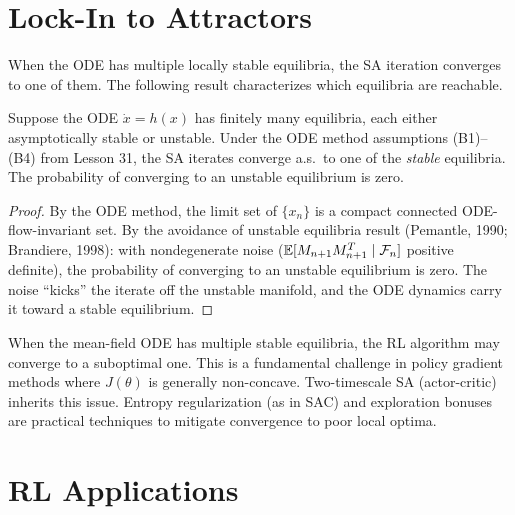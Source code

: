 \documentclass[11pt,a4paper]{article}
\begin{document}

\section{Lock-In to Attractors}
\label{sec:lock-in}

When the ODE has multiple locally stable equilibria, the SA iteration
converges to one of them. The following result characterizes which
equilibria are reachable.

\begin{proposition}
\label{prop:lock-in}
Suppose the ODE $\dot{x} = h(x)$ has finitely many equilibria, each
either asymptotically stable or unstable. Under the ODE method
assumptions (B1)--(B4) from Lesson 31, the SA iterates converge
a.s.\ to one of the \emph{stable} equilibria. The probability of
converging to an unstable equilibrium is zero.
\end{proposition}

\begin{proof}
By the ODE method, the limit set of $\{x_n\}$ is a compact connected
ODE-flow-invariant set. By the avoidance of unstable equilibria
result (Pemantle, 1990; Brandiere, 1998): with nondegenerate noise
($\mathbb{E}[M_{n+1}M_{n+1}^T \mid \mathcal{F}_n]$ positive definite), the
probability of converging to an unstable equilibrium is zero. The
noise ``kicks'' the iterate off the unstable manifold, and the ODE
dynamics carry it toward a stable equilibrium.
\end{proof}

\begin{warning}[title={Multiple Stable Equilibria in RL}]
When the mean-field ODE has multiple stable equilibria, the RL
algorithm may converge to a suboptimal one. This is a fundamental
challenge in policy gradient methods where $J(\theta)$ is generally
non-concave. Two-timescale SA (actor-critic) inherits this issue.
Entropy regularization (as in SAC) and exploration bonuses are
practical techniques to mitigate convergence to poor local optima.
\end{warning}


\section{RL Applications}
\label{sec:rl-apps}
\end{document}
